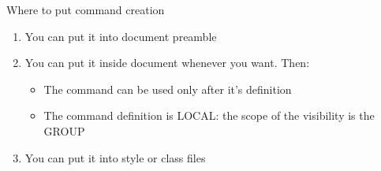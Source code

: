 \cprotect{}


\begin{frame}{Where to put command creation}\relax

\begin{enumerate}
    \item You can put it into document preamble
    \item You can put it inside document whenever you want. Then:
    \begin{itemize}
        \item The command can be used only after it's definition
        \item The command definition is LOCAL: the scope of the visibility is the GROUP
    \end{itemize}
    \item You can put it into style or class files
     
\end{enumerate}
     
\end{frame}